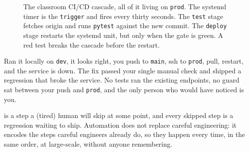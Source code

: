 \begin{figure}
\centering
{}
\caption{The classroom CI/CD cascade, all of it living on \texttt{prod}. The systemd timer is the \texttt{trigger} and fires every thirty seconds. The \texttt{test} stage fetches origin and runs \texttt{pytest} against the new commit. The \texttt{deploy} stage restarts the systemd unit, but only when the gate is green. A red test breaks the cascade before the restart.}
\label{fig:cicd_pipeline}
\end{figure}





 Ran it locally on \texttt{dev}, it
looks right, you push to \texttt{main}, ssh to \texttt{prod}, pull,
restart, and the service is down. The fix passed your single manual check and shipped a regression
that broke the service.
No tests ran the existing endpoints, no guard sat between your push
and \texttt{prod}, and the only person who would have noticed is you.

 is a step a (tired) human
will skip at some point, and every skipped step is a regression waiting to ship.
Automation does not replace careful engineering: it encodes the
steps careful engineers already do, so they happen every time, in
the same order, at large-scale, without anyone remembering.


